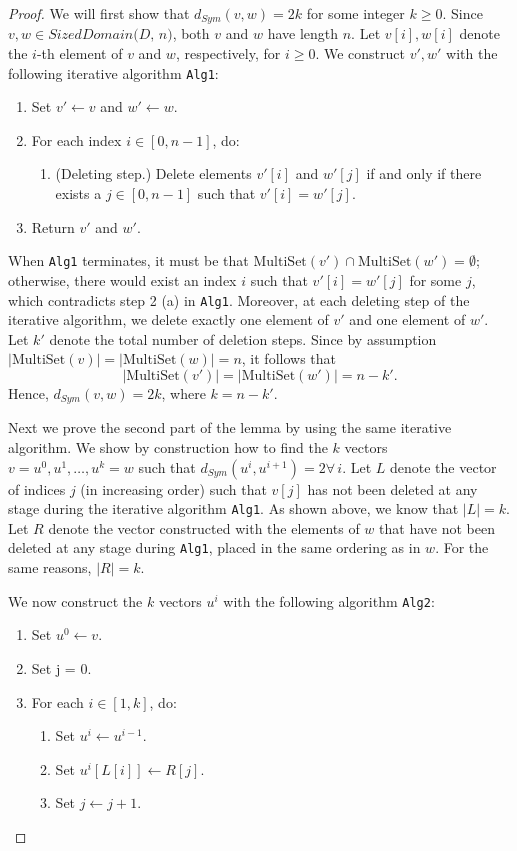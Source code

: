 \documentclass[11pt,a4paper]{article}
\theoremstyle{definition}
\newcommand{\MultiSet}{\mathrm{MultiSet}}
\begin{document}
\begin{proof}
    We will first show that $d_{Sym}(v, w) = 2k$ for some integer $k \geq 0$. Since $v, w \in \textit{SizedDomain(D, n)}$, both $v$ and $w$ have length $n$. Let $v[i], w[i]$ denote the $i$-th element of $v$ and $w$, respectively, for $i \geq 0$. We construct $v', w'$ with the following iterative algorithm \texttt{Alg1}: 
    \begin{enumerate}
        \item Set $v' \leftarrow v$ and $w' \leftarrow w$.
        \item For each index $i \in [0, n-1]$, do:
        \begin{enumerate}
            \item (Deleting step.) Delete elements $v'[i]$ and $w'[j]$ if and only if there exists a $j \in [0, n-1]$ such that $v'[i] = w'[j]$.
        \end{enumerate}
        \item Return $v'$ and $w'$.
    \end{enumerate}
    When \texttt{Alg1} terminates, it must be that $\MultiSet(v') \cap \MultiSet(w') = \emptyset$; otherwise, there would exist an index $i$ such that $v'[i] = w'[j]$ for some $j$, which contradicts step 2 (a) in \texttt{Alg1}. Moreover, at each deleting step of the iterative algorithm, we delete exactly one element of $v'$ and one element of $w'$. Let $k'$ denote the total number of deletion steps. Since by assumption $|\MultiSet(v)| = |\MultiSet(w)| = n$, it follows that
    \[
        |\MultiSet(v')| = |\MultiSet(w')| = n-k'.
    \]
    Hence, $d_{Sym}(v, w) = 2k$, where $k = n-k'$.
    
    Next we prove the second part of the lemma by using the same iterative algorithm. We show by construction how to find the $k$ vectors $v = u^0, u^1, \ldots, u^k = w$ such that $d_{Sym}(u^i, u^{i+1}) = 2 \forall \, i$. Let $L$ denote the vector of indices $j$ (in increasing order) such that $v[j]$ has not been deleted at any stage during the iterative algorithm \texttt{Alg1}. As shown above, we know that $|L| = k$. Let $R$ denote the vector constructed with the elements of $w$ that have not been deleted at any stage during \texttt{Alg1}, placed in the same ordering as in $w$. For the same reasons, $|R| = k$.
    
    We now construct the $k$ vectors $u^i$ with the following algorithm \texttt{Alg2}:
    \begin{enumerate}
        \item Set $u^0 \leftarrow v$.
        \item Set j = 0.
        \item For each $i \in [1, k]$, do:
        \begin{enumerate}
            \item Set $u^i \leftarrow u^{i-1}$.
            \item Set $u^i[L[i]] \leftarrow R[j]$.
            \item Set $j \leftarrow j+1$.
        \end{enumerate}
    \end{enumerate}
\end{proof}
\end{document}
